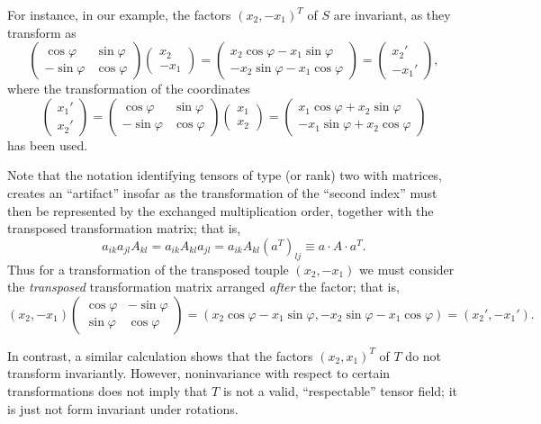 {For instance, in our example, the factors $\left(    {  x}_2 ,- {  x}_1  \right)^T$
of $S$ are invariant, as they transform as
$$
\begin{pmatrix} \cos \varphi & \sin \varphi  \\
                         -\sin \varphi & \cos \varphi
\end{pmatrix}
\begin{pmatrix}
{  x}_2  \\
 - {  x}_1
\end{pmatrix}
=
\begin{pmatrix}
 {  x}_2 \cos \varphi  - x_1 \sin \varphi  \\
            - x_2 \sin \varphi         - {  x}_1 \cos \varphi
\end{pmatrix}
=
\begin{pmatrix}
{  x}_2'  \\
 - {  x}_1'
\end{pmatrix},
$$
where the transformation of the coordinates
$$
\begin{pmatrix}
{  x}_1'  \\
  {  x}_2'
\end{pmatrix}
=
\begin{pmatrix}
 \cos \varphi & \sin \varphi  \\
   -\sin \varphi & \cos \varphi
\end{pmatrix}
\begin{pmatrix}
 {  x}_1  \\
 {  x}_2
\end{pmatrix}
=
\begin{pmatrix}
{  x}_1 \cos \varphi  + x_2 \sin \varphi  \\
- x_1 \sin \varphi         + {  x}_2 \cos \varphi
\end{pmatrix}
$$
has been used.


Note that  the notation identifying tensors of type (or rank) two with matrices,
creates an ``artifact'' insofar as the transformation of the ``second index'' must then be represented by
the exchanged multiplication order, together with the transposed transformation matrix;
that is,
$$
a_{ik}a_{jl}A_{kl}
=  a_{ik}A_{kl}a_{jl}
=  a_{ik}A_{kl}\left(a^T \right)_{lj}
\equiv a\cdot A\cdot a^T .
$$
Thus for a
transformation  of
the transposed touple  $\left(    {  x}_2 ,- {  x}_1  \right)$
we must consider the {\em transposed} transformation matrix arranged {\em after} the factor; that is,
$$
\left(   {  x}_2 , - {  x}_1 \right)
\begin{pmatrix}  \cos \varphi & -\sin \varphi  \\
  \sin \varphi & \cos \varphi
\end{pmatrix}
=
\left(
{  x}_2 \cos \varphi  - x_1 \sin \varphi ,
 - x_2 \sin \varphi         - {  x}_1 \cos \varphi
\right)
=
\left(
{  x}_2'  ,
 - {  x}_1'
\right).
$$



In contrast, a similar calculation shows that the factors
$\left(    {  x}_2 ,  {  x}_1  \right)^T$
of $T$ do not transform invariantly.
However, noninvariance with respect to certain transformations does not imply that
$T$ is not a valid, ``respectable'' tensor field; it is just not form invariant under rotations.
\eexample
}

